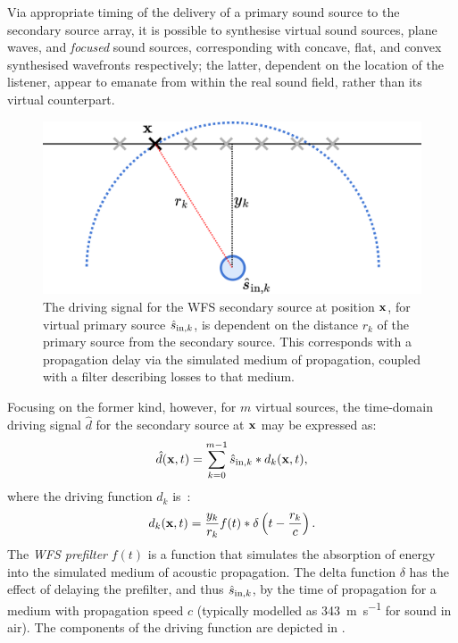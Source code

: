 Via appropriate timing of the delivery of a primary sound source to the
secondary source array, it is possible to synthesise virtual sound sources,
plane waves, and \textit{focused} sound sources, corresponding with concave,
flat, and convex synthesised wavefronts respectively; the latter, dependent
on the location of the listener, appear to emanate from within the real
sound field, rather than its virtual counterpart.

\begin{figure}[ht]
    \centering
    \includegraphics[width=.75\textwidth]{figures/wfs_2}
    \caption{
        The driving signal for the WFS secondary source at position $\mathbf{x}$,
        for virtual primary source $\hat{s}_{\text{in},k}$, is dependent on the distance
        $r_k$ of the primary source from the secondary source.
        This corresponds with a propagation delay via the simulated medium of
        propagation, coupled with a filter describing losses to that medium.
    }
    \label{fig:wfs_2}
\end{figure}

Focusing on the former kind, however, for $m$ virtual sources, the time-domain
driving signal $\hat{d}$ for the secondary source at $\mathbf{x}$ may be expressed
as:
\begin{equation}
    \label{eq:driving-signal}
    \hat{d}(\mathbf{x},t) = \sum_{k=0}^{m-1}\hat{s}_{\text{in},k} \ast d_k(\mathbf{x},t),
\end{equation}
where the driving function $d_k$ is~\citep{ahrens_analytic_2012}:
\begin{equation}
    \label{eq:driving-function}
    d_k(\mathbf{x},t) = \frac{y_k}{r_k}f(t) \ast \delta\left(t - \frac{r_k}{c}\right).
\end{equation}
The \textit{WFS prefilter} $f(t)$ is a function that simulates the absorption of
energy into the simulated medium of acoustic propagation.
The delta function $\delta$ has the effect of delaying the prefilter, and thus
$\hat{s}_{\text{in},k}$, by the time of propagation for a medium with propagation speed $c$
(typically modelled as \qty[per-mode=symbol]{343}{\m\per\s} for sound in air).
The components of the driving function are depicted in .

